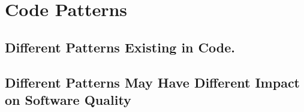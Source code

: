 \section{Code Patterns}
\label{sec:pattern}
\subsection{Different Patterns Existing in Code.}
\subsection{Different Patterns May Have Different Impact on Software Quality}
